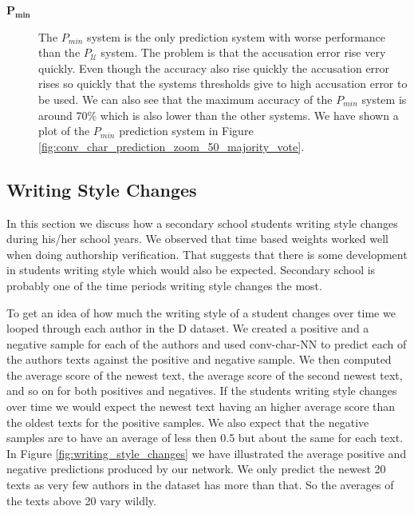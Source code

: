 \begin{description}
    \item[$\mathbf{P_{min}}$]

        The $P_{min}$ system is the only prediction system with worse
        performance than the $P_{\mathcal{U}}$ system. The problem is that
        the accusation error rise very quickly. Even though the accuracy
        also rise quickly the accusation error rises so quickly that the
        systems thresholds give to high accusation error to be used. We
        can also see that the maximum accuracy of the $P_{min}$ system
        is around 70\% which is also lower than the other systems. We
        have shown a plot of the $P_{min}$ prediction system in Figure
        \ref{fig:conv_char_prediction_zoom_50_majority_vote}.


\end{description}


\subsection{Writing Style Changes}
\label{subsec:writing_style_changes}

In this section we discuss how a secondary school students writing style changes
during his/her school years. We observed that time based weights worked well
when doing authorship verification. That suggests that there is some development
in students writing style which would also be expected. Secondary school is
probably one of the time periods writing style changes the most.

To get an idea of how much the writing style of a student changes over time we
looped through each author in the \gls{D} dataset. We created a positive and a
negative sample for each of the authors and used \gls{conv-char-NN} to predict
each of the authors texts against the positive and negative sample. We then
computed the average score of the newest text, the average score of the second
newest text, and so on for both positives and negatives. If the students writing
style changes over time we would expect the newest text having an higher average
score than the oldest texts for the positive samples. We also expect that the
negative samples are to have an average of less then 0.5 but about the same
for each text. In Figure \ref{fig:writing_style_changes} we have illustrated
the average positive and negative predictions produced by our network. We only
predict the newest 20 texts as very few authors in the dataset has more than
that. So the averages of the texts above 20 vary wildly.

